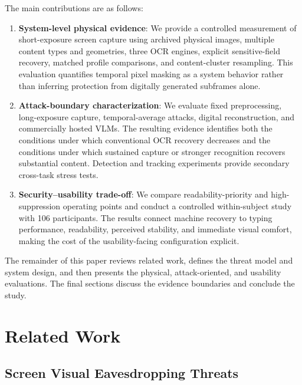 \documentclass{ieeeaccess}
\begin{document}
The main contributions are as follows:
\begin{enumerate}
\item \textbf{System-level physical evidence}: We provide a controlled measurement of short-exposure screen capture using archived physical images, multiple content types and geometries, three OCR engines, explicit sensitive-field recovery, matched profile comparisons, and content-cluster resampling. This evaluation quantifies temporal pixel masking as a system behavior rather than inferring protection from digitally generated subframes alone.

\item \textbf{Attack-boundary characterization}: We evaluate fixed preprocessing, long-exposure capture, temporal-average attacks, digital reconstruction, and commercially hosted VLMs. The resulting evidence identifies both the conditions under which conventional OCR recovery decreases and the conditions under which sustained capture or stronger recognition recovers substantial content. Detection and tracking experiments provide secondary cross-task stress tests.

\item \textbf{Security--usability trade-off}: We compare readability-priority and high-suppression operating points and conduct a controlled within-subject study with 106 participants. The results connect machine recovery to typing performance, readability, perceived stability, and immediate visual comfort, making the cost of the usability-facing configuration explicit.
\end{enumerate}

The remainder of this paper reviews related work, defines the threat model and system design, and then presents the physical, attack-oriented, and usability evaluations. The final sections discuss the evidence boundaries and conclude the study.


\section{Related Work}
\label{sec:related}

\subsection{Screen Visual Eavesdropping Threats}
\end{document}
